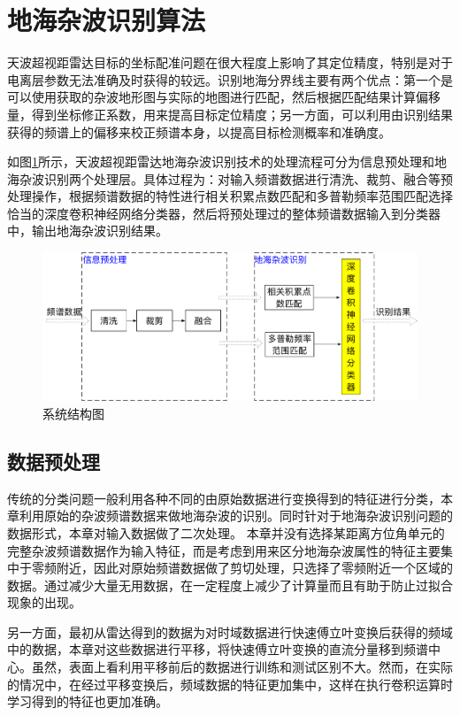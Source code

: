 \section{地海杂波识别算法}
\label{sec:othr_cnn}
天波超视距雷达目标的坐标配准问题在很大程度上影响了其定位精度，特别是对于电离层参数无法准确及时获得的较远。识别地海分界线主要有两个优点：第一个是可以使用获取的杂波地形图与实际的地图进行匹配，然后根据匹配结果计算偏移量，得到坐标修正系数，用来提高目标定位精度；另一方面，可以利用由识别结果获得的频谱上的偏移来校正频谱本身，以提高目标检测概率和准确度。

如图\ref{fig:system}所示，天波超视距雷达地海杂波识别技术的处理流程可分为信息预处理和地海杂波识别两个处理层。具体过程为：对输入频谱数据进行清洗、裁剪、融合等预处理操作，根据频谱数据的特性进行相关积累点数匹配和多普勒频率范围匹配选择恰当的深度卷积神经网络分类器，然后将预处理过的整体频谱数据输入到分类器中，输出地海杂波识别结果。

\begin{figure}[H]
	\centering
	\includegraphics[width=\textwidth]{figures/othr/system}
	\caption{系统结构图}
	\label{fig:system}
\end{figure}

\subsection{数据预处理}

传统的分类问题一般利用各种不同的由原始数据进行变换得到的特征进行分类，本章利用原始的杂波频谱数据来做地海杂波的识别。同时针对于地海杂波识别问题的数据形式，本章对输入数据做了二次处理。
本章并没有选择某距离方位角单元的完整杂波频谱数据作为输入特征，而是考虑到用来区分地海杂波属性的特征主要集中于零频附近，因此对原始频谱数据做了剪切处理，只选择了零频附近一个区域的数据。通过减少大量无用数据，在一定程度上减少了计算量而且有助于防止过拟合现象的出现。

另一方面，最初从雷达得到的数据为对时域数据进行快速傅立叶变换后获得的频域中的数据，本章对这些数据进行平移，将快速傅立叶变换的直流分量移到频谱中心。虽然，表面上看利用平移前后的数据进行训练和测试区别不大。然而，在实际的情况中，在经过平移变换后，频域数据的特征更加集中，这样在执行卷积运算时学习得到的特征也更加准确。

